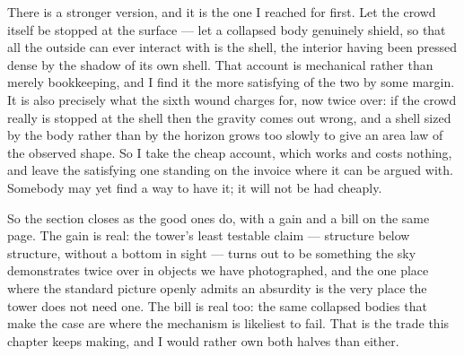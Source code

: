 There is a stronger version, and it is the one I reached for first. Let the crowd itself be stopped at the surface --- let a collapsed body genuinely shield, so that all the outside can ever interact with is the shell, the interior having been pressed dense by the shadow of its own shell. That account is mechanical rather than merely bookkeeping, and I find it the more satisfying of the two by some margin. It is also precisely what the sixth wound charges for, now twice over: if the crowd really is stopped at the shell then the gravity comes out wrong, and a shell sized by the body rather than by the horizon grows too slowly to give an area law of the observed shape. So I take the cheap account, which works and costs nothing, and leave the satisfying one standing on the invoice where it can be argued with. Somebody may yet find a way to have it; it will not be had cheaply.

So the section closes as the good ones do, with a gain and a bill on the same page. The gain is real: the tower's least testable claim --- structure below structure, without a bottom in sight --- turns out to be something the sky demonstrates twice over in objects we have photographed, and the one place where the standard picture openly admits an absurdity is the very place the tower does not need one. The bill is real too: the same collapsed bodies that make the case are where the mechanism is likeliest to fail. That is the trade this chapter keeps making, and I would rather own both halves than either.

